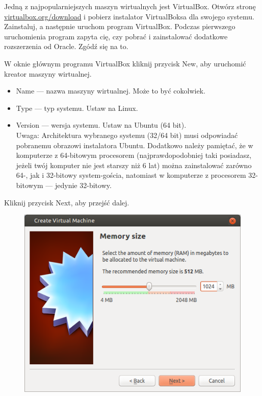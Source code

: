 Jedną z najpopularniejszych maszyn wirtualnych jest VirtualBox. Otwórz stronę \href{https://www.virtualbox.org/wiki/Downloads}{virtualbox.org/download} i pobierz instalator VirtualBoksa dla swojego systemu. Zainstaluj, a następnie uruchom program VirtualBox. Podczas pierwszego uruchomienia program zapyta cię, czy pobrać i zainstalować dodatkowe rozszerzenia od Oracle. Zgódź się na to.

W oknie głównym programu VirtualBox kliknij przycisk \textcolor{ubuntu_orange}{New}, aby uruchomić kreator maszyny wirtualnej.

\begin{itemize}
\item \textcolor{ubuntu_orange}{Name} --- nazwa maszyny wirtualnej. Może to być cokolwiek.
\item \textcolor{ubuntu_orange}{Type} --- typ systemu. Ustaw na \textcolor{ubuntu_orange}{Linux}.
\item \textcolor{ubuntu_orange}{Version} --- wersja systemu. Ustaw na \textcolor{ubuntu_orange}{Ubuntu (64 bit)}.\\
Uwaga: Architektura wybranego systemu (32/64 bit) musi odpowiadać pobranemu obrazowi instalatora Ubuntu. Dodatkowo należy pamiętać, że w komputerze z 64-bitowym procesorem (najprawdopodobniej taki posiadasz, jeżeli twój komputer nie jest starszy niż 6 lat) można zainstalować zarówno 64-, jak i 32-bitowy system-gościa, natomiast w komputerze z procesorem 32-bitowym --- jedynie 32-bitowy.
\end{itemize}
\begin{flushright}
Kliknij przycisk \textcolor{ubuntu_orange}{Next}, aby przejść dalej.
\end{flushright}

\clearpage
\begin{figure}
	\vspace{-10pt}
	\includegraphics[width=\linewidth]{images/virtualbox_wizard2.png}
\end{figure}

